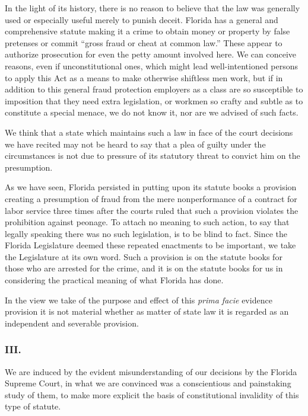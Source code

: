 \documentclass[
  letterpaper,
  11pt,
  DIV=9,
  openright]{scrbook}
\begin{document}
In the light of its history, there is no reason to believe that the law
was generally used or especially useful merely to punish deceit. Florida
has a general and comprehensive statute making it a crime to obtain
money or property by false pretenses or commit ``gross fraud or cheat at
common law.'' These appear to authorize prosecution for even the petty
amount involved here. We can conceive reasons, even if unconstitutional
ones, which might lead well-intentioned persons to apply this Act as a
means to make otherwise shiftless men work, but if in addition to this
general fraud protection employers as a class are so susceptible to
imposition that they need extra legislation, or workmen so crafty and
subtle as to constitute a special menace, we do not know it, nor are we
advised of such facts.

We think that a state which maintains such a law in face of the court
decisions we have recited may not be heard to say that a plea of guilty
under the circumstances is not due to pressure of its statutory threat
to convict him on the presumption.

As we have seen, Florida persisted in putting upon its statute books a
provision creating a presumption of fraud from the mere nonperformance
of a contract for labor service three times after the courts ruled that
such a provision violates the prohibition against peonage. To attach no
meaning to such action, to say that legally speaking there was no such
legislation, is to be blind to fact. Since the Florida Legislature
deemed these repeated enactments to be important, we take the
Legislature at its own word. Such a provision is on the statute books
for those who are arrested for the crime, and it is on the statute books
for us in considering the practical meaning of what Florida has done.

In the view we take of the purpose and effect of this \emph{prima facie}
evidence provision it is not material whether as matter of state law it
is regarded as an independent and severable provision.

\subsubsection{III.}\label{iii.}

We are induced by the evident misunderstanding of our decisions by the
Florida Supreme Court, in what we are convinced was a conscientious and
painstaking study of them, to make more explicit the basis of
constitutional invalidity of this type of statute.
\end{document}
